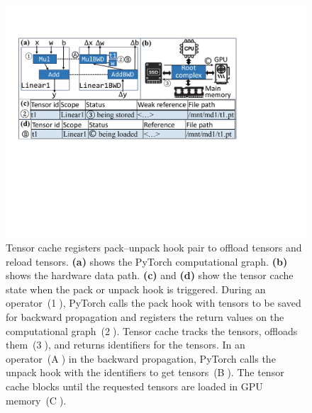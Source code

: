 \begin{figure}[!t]
\centering
\includegraphics[width=0.91\linewidth]{figures/SSDTrain/hooks.pdf}
\caption{\label{fig:hooks} Tensor cache registers pack--unpack hook pair to offload tensors and reload tensors. \textbf{(a)} shows the PyTorch computational graph. \textbf{(b)} shows the hardware data path. \textbf{(c)} and \textbf{(d)} show the tensor cache state when the pack or unpack hook is triggered. During an operator~(\textcircled{1}), PyTorch calls the pack hook with tensors to be saved for backward propagation and registers the return values on the computational graph~(\textcircled{2}). Tensor cache tracks the tensors, offloads them~(\textcircled{3}), and returns identifiers for the tensors. In an operator~(\textcircled{A}) in the backward propagation, PyTorch calls the unpack hook with the identifiers to get tensors~(\textcircled{B}). The tensor cache blocks until the requested tensors are loaded in GPU memory~(\textcircled{C}). }
\end{figure}



